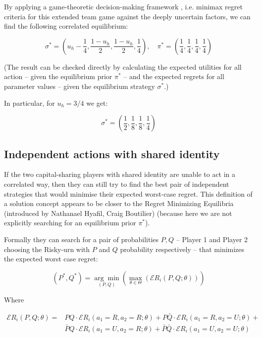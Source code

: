 \documentclass{article}
\theoremstyle{definition}
\begin{document}
By applying a game-theoretic decision-making framework \cite{essay:EssayOnUncertaintyKonczer2024, arxiv:ExtendedEquilibrium}, i.e. minimax regret criteria for this extended team game against the deeply uncertain factors, we can find the following correlated equilibrium:

\begin{equation}
    \boxed{\sigma^*= \left (u_h-\frac{1}{4},\frac{1-u_h}{2},\frac{1-u_h}{2},\frac{1}{4} \right)}, \quad
    \pi^*= \left ( \frac{1}{4}, \frac{1}{4}, \frac{1}{4},\frac{1}{4} \right)
\end{equation}

(The result can be checked directly by calculating the expected utilities for all action -- given the equilibrium prior $\pi^*$ -- and the expected regrets for all parameter values -- given the equilibrium strategy $\sigma^*$.)

In particular, for $u_h=3/4$ we get:

\begin{equation}
    \sigma^*= \left (\frac{1}{2},\frac{1}{8},\frac{1}{8},\frac{1}{4} \right)
\end{equation}

\subsection{Independent actions with shared identity}

If the two capital-sharing players with shared identity are unable to act in a correlated way, then they can still try to find the best pair of independent strategies that would minimise their expected worst-case regret. This definition of a solution concept appears to be closer to the Regret Minimizing Equilibria (introduced by Nathanael Hyafil, Craig Boutilier) \cite{arxiv:RegretMinimizingEquilibria} (because here we are not explicitly searching for an equilibrium prior $\pi^*$).

Formally they can search for a pair of probabilities $P, Q$ -- Player 1 and Player 2 choosing the Risky-urn with $P$ and $Q$ probability respectively -- that minimizes the expected worst case regret:

\begin{equation}
    (P^*,Q^*) =
    \underset{(P,Q)}{\arg\min}
    \left (
    \max_{\theta \in \Theta}
    \left (\mathcal{E}R_i(P,Q;\theta) \right )
    \right )
\end{equation}

Where 

\begin{equation}
\begin{split}
    \mathcal{E}R_i(P,Q;\theta)
    = &
    P Q \cdot \mathcal{E}R_i(a_1=R,a_2=R;\theta) +
    P \bar{Q} \cdot \mathcal{E}R_i(a_1=R,a_2=U;\theta) + \\
    & \bar{P} Q \cdot \mathcal{E}R_i(a_1=U,a_2=R;\theta) +
    \bar{P} \bar{Q} \cdot \mathcal{E}R_i(a_1=U,a_2=U;\theta)
\end{split}
\end{equation}
\end{document}
